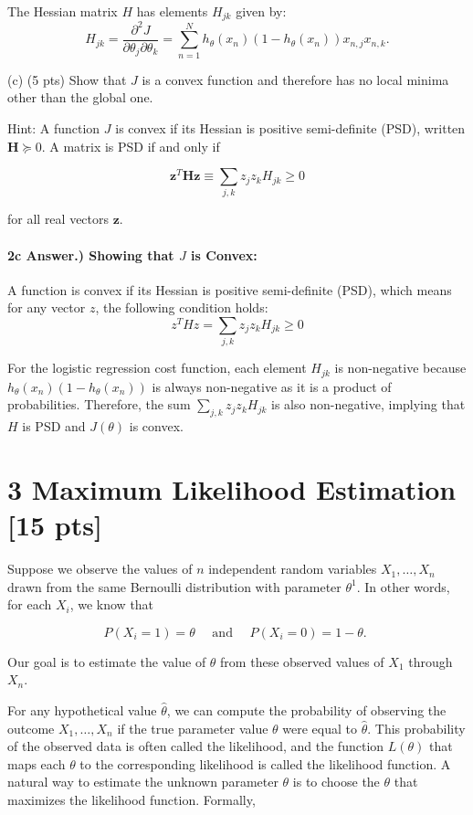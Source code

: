 \documentclass[10pt]{article}
\begin{document}
The Hessian matrix $H$ has elements $H_{jk}$ given by:
\[ H_{jk} = \frac{\partial^2 J}{\partial \theta_j \partial \theta_k} = \sum_{n=1}^{N} h_{\theta}(x_n)(1 - h_{\theta}(x_n)) x_{n,j} x_{n,k}. \]


(c) (5 pts) Show that $J$ is a convex function and therefore has no local minima other than the global one.

Hint: A function $J$ is convex if its Hessian is positive semi-definite (PSD), written $\boldsymbol{H} \succeq 0$. A matrix is PSD if and only if

$$
\boldsymbol{z}^{T} \boldsymbol{H} \boldsymbol{z} \equiv \sum_{j, k} z_{j} z_{k} H_{j k} \geq 0
$$

for all real vectors $\boldsymbol{z}$.

\paragraph{2c Answer.) Showing that $J$ is Convex:}
\hspace{1 cm}

A function is convex if its Hessian is positive semi-definite (PSD), which means for any vector $z$, the following condition holds:
\[ z^T H z = \sum_{j,k} z_j z_k H_{jk} \geq 0 \]

For the logistic regression cost function, each element $H_{jk}$ is non-negative because $h_{\theta}(x_n)(1 - h_{\theta}(x_n))$ is always non-negative as it is a product of probabilities. Therefore, the sum $\sum_{j,k} z_j z_k H_{jk}$ is also non-negative, implying that $H$ is PSD and $J(\theta)$ is convex.


\section*{3 Maximum Likelihood Estimation [15 pts]}
Suppose we observe the values of $n$ independent random variables $X_{1}, \ldots, X_{n}$ drawn from the same Bernoulli distribution with parameter $\theta^{1}$. In other words, for each $X_{i}$, we know that

$$
P\left(X_{i}=1\right)=\theta \quad \text { and } \quad P\left(X_{i}=0\right)=1-\theta \text {. }
$$

Our goal is to estimate the value of $\theta$ from these observed values of $X_{1}$ through $X_{n}$.

For any hypothetical value $\hat{\theta}$, we can compute the probability of observing the outcome $X_{1}, \ldots, X_{n}$ if the true parameter value $\theta$ were equal to $\hat{\theta}$. This probability of the observed data is often called the likelihood, and the function $L(\theta)$ that maps each $\theta$ to the corresponding likelihood is called the likelihood function. A natural way to estimate the unknown parameter $\theta$ is to choose the $\theta$ that maximizes the likelihood function. Formally,
\end{document}
